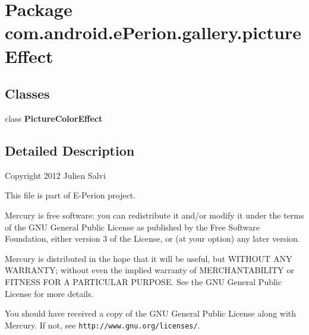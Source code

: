 \section{Package com.\-android.\-e\-Perion.\-gallery.\-picture\-Effect}
\label{namespacecom_1_1android_1_1e_perion_1_1gallery_1_1picture_effect}
\subsection*{Classes}
\begin{DoxyCompactItemize}
\item 
class {\bf Picture\-Color\-Effect}
\end{DoxyCompactItemize}


\subsection{Detailed Description}
Copyright 2012 Julien Salvi

This file is part of E-\/\-Perion project.

Mercury is free software\-: you can redistribute it and/or modify it under the terms of the G\-N\-U General Public License as published by the Free Software Foundation, either version 3 of the License, or (at your option) any later version.

Mercury is distributed in the hope that it will be useful, but W\-I\-T\-H\-O\-U\-T A\-N\-Y W\-A\-R\-R\-A\-N\-T\-Y; without even the implied warranty of M\-E\-R\-C\-H\-A\-N\-T\-A\-B\-I\-L\-I\-T\-Y or F\-I\-T\-N\-E\-S\-S F\-O\-R A P\-A\-R\-T\-I\-C\-U\-L\-A\-R P\-U\-R\-P\-O\-S\-E. See the G\-N\-U General Public License for more details.

You should have received a copy of the G\-N\-U General Public License along with Mercury. If not, see {\tt http\-://www.\-gnu.\-org/licenses/}. 